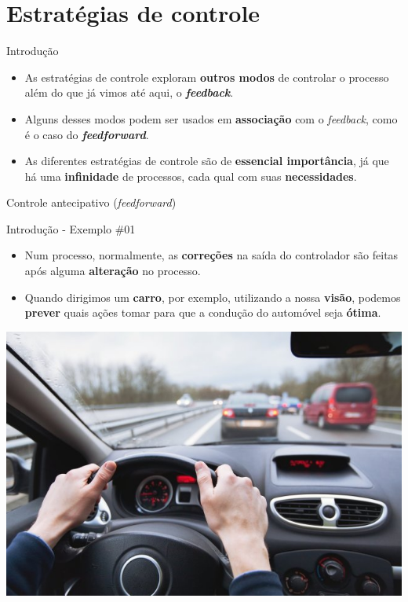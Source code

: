 \section{Estratégias de controle}

\begin{frame}{Introdução}
	\begin{block}{}
		\begin{itemize}
			\item As estratégias de controle exploram \textbf{outros modos} de controlar o processo além do que já vimos até aqui, o \textbf{\textit{feedback}}.
			\item Alguns desses modos podem ser usados em \textbf{associação} com o \textit{feedback}, como é o caso do \textbf{\textit{feedforward}}.
			\item As diferentes estratégias de controle são de \textbf{essencial importância}, já que há uma \textbf{infinidade} de processos, cada qual com suas \textbf{necessidades}.
		\end{itemize}
	\end{block}
\end{frame}


\begin{frame}{Controle antecipativo (\textit{feedforward})}
	\begin{block}{Introdução - Exemplo \#01}
		\begin{itemize}
			\item Num processo, normalmente, as \textbf{correções} na saída do controlador são feitas após alguma \textbf{alteração} no processo.
			\item Quando dirigimos um \textbf{carro}, por exemplo, utilizando a nossa \textbf{visão}, podemos \textbf{prever} quais ações tomar para que a condução do automóvel seja \textbf{ótima}.
		\end{itemize}
	\end{block}
	
	\centering
	\includegraphics[height=0.35\linewidth]{Figuras/Ch15/fig1}
\end{frame}


